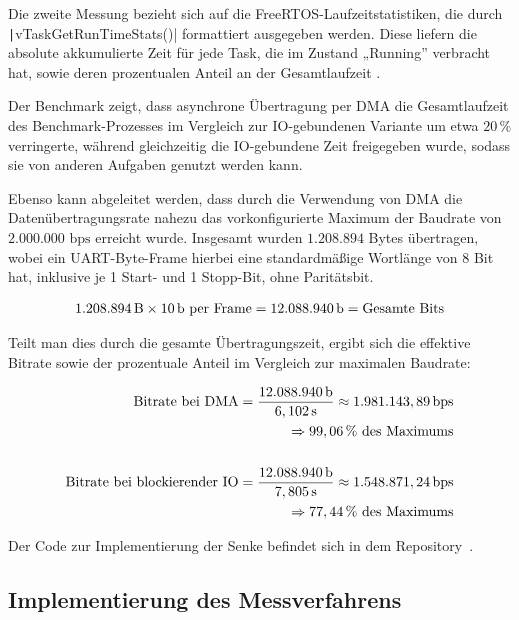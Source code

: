 Die zweite Messung bezieht sich auf die FreeRTOS-Laufzeitstatistiken, die durch
\linebreak \texttt|vTaskGetRunTimeStats()| formattiert ausgegeben
werden. Diese liefern die absolute akkumulierte Zeit für jede Task, die im
Zustand „Running” verbracht hat, sowie deren prozentualen Anteil an der
Gesamtlaufzeit \cite{freertos_runtime_stats}.

Der Benchmark zeigt, dass asynchrone Übertragung per DMA die Gesamtlaufzeit des
Benchmark-Prozesses im Vergleich zur IO-gebundenen Variante um etwa $20\,\%$
verringerte, während gleichzeitig die IO-gebundene Zeit freigegeben wurde,
sodass sie von anderen Aufgaben genutzt werden kann.

Ebenso kann abgeleitet werden, dass durch die Verwendung von DMA die
Datenübertragungsrate nahezu das vorkonfigurierte Maximum der Baudrate von
$2.000.000\text{ bps}$ erreicht wurde. Insgesamt wurden $1.208.894$ Bytes
übertragen, wobei ein UART-Byte-Frame hierbei eine standardmäßige Wortlänge von
8 Bit hat, inklusive je 1 Start- und 1 Stopp-Bit, ohne Paritätsbit.

\begin{align*}
    1.208.894\text{\,B} \times 10\text{\,b per Frame} =
    12.088.940 \text{\,b} = \text{Gesamte Bits}
\end{align*}

Teilt man dies durch die gesamte Übertragungszeit, ergibt sich die effektive
Bitrate sowie der prozentuale Anteil im Vergleich zur maximalen Baudrate:

\begin{align*}
    \text{Bitrate bei DMA} =
    \frac{12.088.940\text{\,b}}{6,102\text{\,s}} \approx
    1.981.143,89 \text{\,bps} \\
    \quad \Rightarrow 99,06\,\%\text{ des Maximums} \\
    \\
    \text{Bitrate bei blockierender IO} =
    \frac{12.088.940\text{\,b}}{7,805\text{\,s}} \approx
    1.548.871,24 \text{\,bps} \\
    \quad \Rightarrow 77,44\,\% \text{ des Maximums}
\end{align*}

Der Code zur Implementierung der Senke befindet sich in dem
Repository~\cite{freertos_threadsafe_sink}.

\subsection{Implementierung des Messverfahrens}

